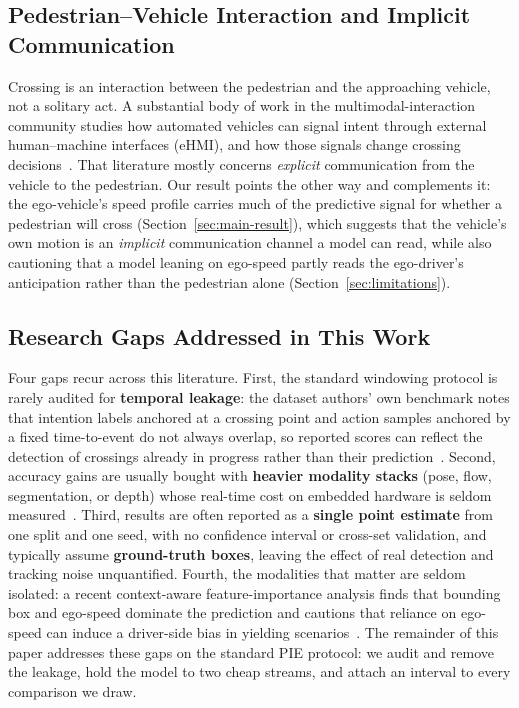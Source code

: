 \documentclass[mti,article,submit,moreauthors]{Definitions/mdpi}
\begin{document}
\subsection{Pedestrian--Vehicle Interaction and Implicit Communication}

Crossing is an interaction between the pedestrian and the approaching vehicle, not a solitary act. A substantial body of work in the multimodal-interaction community studies how automated vehicles can signal intent through external human--machine interfaces (eHMI), and how those signals change crossing decisions~\citep{riener2019guest,rouchitsas2019ehmi,alhawiti2024ehmi,rezwana2024interactions}. That literature mostly concerns \emph{explicit} communication from the vehicle to the pedestrian. Our result points the other way and complements it: the ego-vehicle's speed profile carries much of the predictive signal for whether a pedestrian will cross (Section~\ref{sec:main-result}), which suggests that the vehicle's own motion is an \emph{implicit} communication channel a model can read, while also cautioning that a model leaning on ego-speed partly reads the ego-driver's anticipation rather than the pedestrian alone (Section~\ref{sec:limitations}).

\subsection{Research Gaps Addressed in This Work}

Four gaps recur across this literature. First, the standard windowing protocol is rarely audited for \textbf{temporal leakage}: the dataset authors' own benchmark notes that intention labels anchored at a crossing point and action samples anchored by a fixed time-to-event do not always overlap, so reported scores can reflect the detection of crossings already in progress rather than their prediction~\citep{rasouli2024diving}. Second, accuracy gains are usually bought with \textbf{heavier modality stacks} (pose, flow, segmentation, or depth) whose real-time cost on embedded hardware is seldom measured~\citep{azarmi2025pipnet,cadena2022pedgraph}. Third, results are often reported as a \textbf{single point estimate} from one split and one seed, with no confidence interval or cross-set validation, and typically assume \textbf{ground-truth boxes}, leaving the effect of real detection and tracking noise unquantified. Fourth, the modalities that matter are seldom isolated: a recent context-aware feature-importance analysis finds that bounding box and ego-speed dominate the prediction and cautions that reliance on ego-speed can induce a driver-side bias in yielding scenarios~\citep{azarmi2024featureimportance}. The remainder of this paper addresses these gaps on the standard PIE protocol: we audit and remove the leakage, hold the model to two cheap streams, and attach an interval to every comparison we draw.
\end{document}
